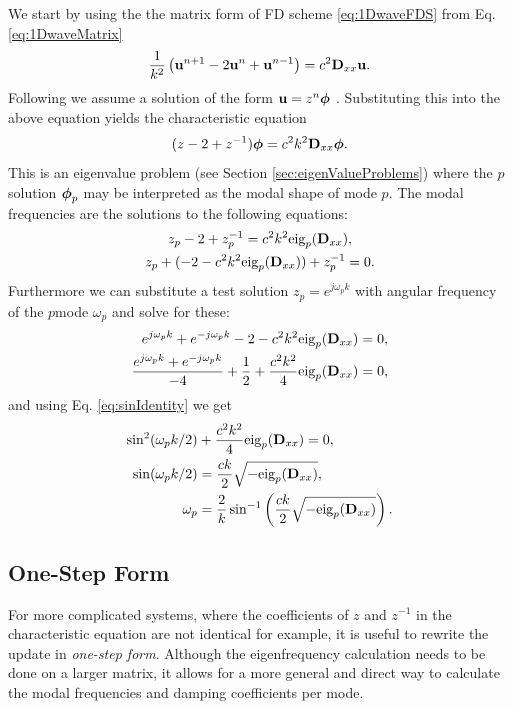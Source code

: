 We start by using the the matrix form of FD scheme \eqref{eq:1DwaveFDS} from Eq. \eqref{eq:1DwaveMatrix}
\begin{equation*}
    \frac{1}{k^2}\left(\mathbf{u}^{n+1}-2\mathbf{u}^n+\mathbf{u}^{n-1}\right) = c^2 \mathbf{D}_{xx}\mathbf{u}.
\end{equation*}
Following \cite{theBible} we assume a solution of the form $\mathbf{u} = z^n\boldsymbol{\phi}$ . Substituting this into the above equation yields the characteristic equation
\begin{equation}
    (z - 2 + z^{-1})\boldsymbol{\phi} = c^2k^2\mathbf{D}_{xx} \boldsymbol{\phi}.
\end{equation}
This is an eigenvalue problem (see Section \ref{sec:eigenValueProblems}) where the $p$\th solution $\boldsymbol{\phi}_p$ may be interpreted as the modal shape of mode $p$. The modal frequencies are the solutions to the following equations:
\begin{gather}
    z_p-2+z_p^{-1} = c^2k^2\text{eig}_p(\mathbf{D}_{xx}),\nonumber\\
    z_p+(-2-c^2k^2\text{eig}_p(\mathbf{D}_{xx}))+z_p^{-1}=0.
\end{gather}
 Furthermore we can substitute a test solution $z_p=e^{j\omega_pk}$ with angular frequency of the $p$\th mode $\omega_p$ and solve for these:
\begin{align*}
    e^{j\omega_pk}+e^{-j\omega_pk}-2-c^2k^2\text{eig}_p(\mathbf{D}_{xx})&=0,\\
    \frac{e^{j\omega_pk}+e^{-j\omega_pk}}{-4}+\frac{1}{2}+\frac{c^2k^2}{4}\text{eig}_p(\mathbf{D}_{xx})&=0,
\end{align*}
and using Eq. \eqref{eq:sinIdentity} we get
\begin{align}
    \sin^2(\omega_pk/2)&+\frac{c^2k^2}{4}\text{eig}_p(\mathbf{D}_{xx})=0,\nonumber\\
    \sin(\omega_pk/2)&=\frac{ck}{2}\sqrt{-\text{eig}_p(\mathbf{D}_{xx})},\nonumber\\
    \omega_p &= \frac{2}{k}\sin^{-1}\left(\frac{ck}{2}\sqrt{-\text{eig}_p(\mathbf{D}_{xx})}\right).
\end{align}

\subsection{One-Step Form}
For more complicated systems, where the coefficients of $z$ and $z^{-1}$ in the characteristic equation are not identical for example, it is useful to rewrite the update in \textit{one-step form}. Although the eigenfrequency calculation needs to be done on a larger matrix, it allows for a more general and direct way to calculate the modal frequencies and damping coefficients per mode. 

